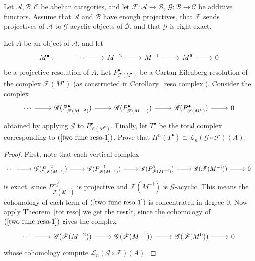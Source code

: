 \begin{exercise}\label{two func exercise}
Let $\mathcal{A},\mathcal{B},\mathcal{C}$ be abelian categories, and let $\mathscr{F}:\mathcal{A}\to\mathcal{B}$, $\mathscr{G}:\mathcal{B}\to\mathcal{C}$ be additive
functors. Assume that $\mathcal{A}$ and $\mathcal{B}$ have enough projectives, that $\mathscr{F}$ sends projectives of $\mathcal{A}$ to $\mathscr{G}$-acyclic objects of $\mathcal{B}$, and that $\mathscr{G}$ is right-exact.\par
Let $A$ be an object of $\mathcal{A}$, and let 
\[\begin{tikzcd}
M^\bullet:&\cdots\ar[r]&M^{-2}\ar[r]&M^{-1}\ar[r]&M^0\ar[r]&0
\end{tikzcd}\]
be a projective resolution of $A$. Let $P^\bullet_{\mathscr{F}(M^\bullet)}$ be a Cartan-Eilenberg resolution of the complex $\mathscr{F}(M^\bullet)$ (as constructed in Corollary~\ref{reso complex}). Consider the complex
\begin{equation}\label{two func reso-1}
\begin{tikzcd}
\cdots\ar[r]&\mathscr{G}(P^\bullet_{\mathscr{F}(M^{-2})})\ar[r]&\mathscr{G}(P^\bullet_{\mathscr{F}(M^{-1})})\ar[r]&\mathscr{G}(P^\bullet_{\mathscr{F}(M^{0})})\ar[r]&0
\end{tikzcd}
\end{equation}
obtained by applying $\mathscr{G}$ to $P^\bullet_{\mathscr{F}(M^\bullet)}$. Finally, let $T^\bullet$ be the total complex corresponding
to $(\ref{two func reso-1})$. Prove that $H^n(T^\bullet)\cong\mathcal{L}_n(\mathscr{G}\circ\mathscr{F})(A)$.
\end{exercise}
\begin{proof}
First, note that each vertical complex 
\[\begin{tikzcd}
\cdots\ar[r]&\mathscr{G}(P^{-2}_{\mathscr{F}(M^{-i})})\ar[r]&\mathscr{G}(P^{-1}_{\mathscr{F}(M^{-i})})\ar[r]&\mathscr{G}(P^{0}_{\mathscr{F}(M^{-i})})\ar[r]&\mathscr{G}(\mathscr{F}(M^{-i}))\ar[r]&0
\end{tikzcd}\]
is exact, since $P^{-j}_{\mathscr{F}(M^{-i})}$ is projective and $\mathscr{F}(M^{-i})$ is $\mathscr{G}$-acyclic. This means the cohomology of each term of $(\ref{two func reso-1})$ is concentrated in degree $0$. Now apply Theorem~\ref{tot reso} we get the result, since the cohomology of $(\ref{two func reso-1})$ gives the complex
\[\begin{tikzcd}
\cdots\ar[r]&\mathscr{G}(\mathscr{F}(M^{-2}))\ar[r]&\mathscr{G}(\mathscr{F}(M^{-1}))\ar[r]&\mathscr{G}(\mathscr{F}(M^{0}))\ar[r]&0
\end{tikzcd}\]
whose cohomology compute $\mathcal{L}_n(\mathscr{G}\circ\mathscr{F})(A)$.
\end{proof}
